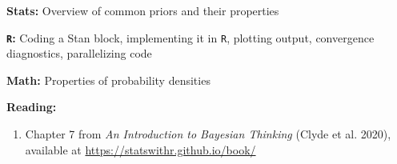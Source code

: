 \documentclass[12pt]{article}
\begin{document}
\noindent \textbf{Stats:} Overview of common priors and their properties

\noindent \textbf{\texttt{R}:} Coding a Stan block, implementing it in \texttt{R}, plotting output, convergence diagnostics, parallelizing code

\noindent \textbf{Math:} Properties of probability densities

\noindent \textbf{Reading:}

\begin{enumerate}[1)]

\item Chapter 7 from \emph{An Introduction to Bayesian Thinking} (Clyde et al. 2020), available at \href{https://statswithr.github.io/book/}{https://statswithr.github.io/book/}

\end{enumerate}
\end{document}

